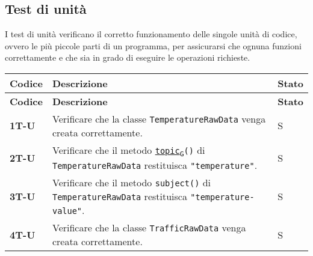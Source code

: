 \subsection{Test di unità}
I test di unità verificano il corretto funzionamento delle singole unità di codice, ovvero le più piccole parti di un programma,
per assicurarsi che ognuna funzioni correttamente e che sia in grado di eseguire le operazioni richieste. \\
\begin{longtable}{|>{\raggedright\arraybackslash}m{}|>{\raggedright\arraybackslash}m{}|>{\raggedright\arraybackslash}m{}|}
	\hline
	\textbf{Codice} & \textbf{Descrizione}                                                                                                                                                                                                                             & \textbf{Stato} \\
	\hline
	\endfirsthead
	\hline
	\textbf{Codice} & \textbf{Descrizione}                                                                                                                                                                                                                             & \textbf{Stato} \\
	\endhead
	\multicolumn{3}{|c|}{\textbf{Python}}
	\hline
	\textbf{1T-U}   & Verificare che la classe \texttt{TemperatureRawData} venga creata correttamente.                                                                                                                                                                 & S              \\
	\hline
	\textbf{2T-U}   & Verificare che il metodo \texttt{\href{https://7last.github.io/docs/rtb/documentazione-interna/glossario\#topic}{topic\textsubscript{G}}()} di \texttt{TemperatureRawData} restituisca \texttt{"temperature"}.                                   & S              \\
	\hline
	\textbf{3T-U}   & Verificare che il metodo \texttt{subject()} di \texttt{TemperatureRawData} restituisca \texttt{"temperature-value"}.                                                                                                                             & S              \\
	\hline
	\textbf{4T-U}   & Verificare che la classe \texttt{TrafficRawData} venga creata correttamente.                                                                                                                                                                     & S              \\

\end{longtable}
